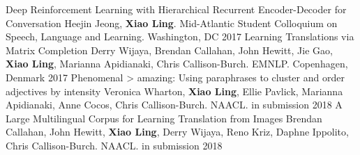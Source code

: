 \begin{cvhonors}
  \cvhonor
    {Deep Reinforcement Learning with Hierarchical Recurrent Encoder-Decoder for Conversation}
    {Heejin Jeong, \textbf{Xiao Ling}.  Mid-Atlantic Student Colloquium on Speech, Language and Learning.}
    {Washington, DC}
    {2017}
  \cvhonor
    {Learning Translations via Matrix Completion}
    {Derry Wijaya, Brendan Callahan, John Hewitt, Jie Gao, \textbf{Xiao Ling}, Marianna Apidianaki, Chris Callison-Burch. EMNLP.}
    {Copenhagen, Denmark}
    {2017}
  \cvhonor
    {Phenomenal > amazing: Using paraphrases to cluster and order adjectives by intensity}
    {Veronica Wharton, \textbf{Xiao Ling}, Ellie Pavlick, Marianna Apidianaki, Anne Cocos, Chris Callison-Burch. NAACL.}
    {in submission}
    {2018}
  \cvhonor
    {A Large Multilingual Corpus for Learning Translation from Images}
    {Brendan Callahan, John Hewitt, \textbf{Xiao Ling}, Derry Wijaya, Reno Kriz, Daphne Ippolito,  Chris Callison-Burch. NAACL.}
    {in submission}
    {2018}
\end{cvhonors}



